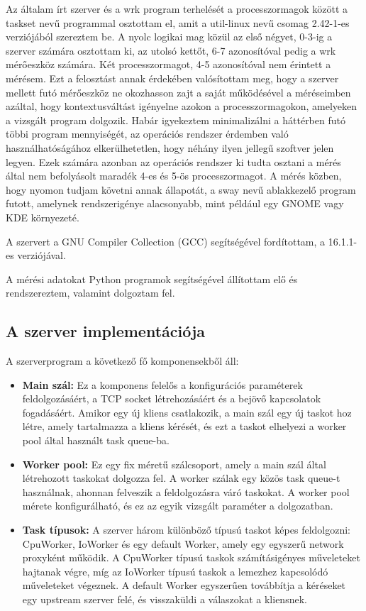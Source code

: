 \documentclass[11pt,a4paper]{article}
\begin{document}
Az általam írt szerver és a wrk program terhelését a processzormagok között a taskset nevű programmal osztottam el,
amit a util-linux nevű csomag 2.42-1-es verziójából szereztem be.
A nyolc logikai mag közül az első négyet, 0-3-ig a szerver számára osztottam ki, az utolsó kettőt, 6-7 azonosítóval
pedig a wrk mérőeszköz számára. Két processzormagot, 4-5 azonosítóval nem érintett a mérésem.
Ezt a felosztást annak érdekében valósítottam meg, hogy a szerver mellett futó mérőeszköz ne okozhasson zajt a saját
működésével a méréseimben azáltal, hogy kontextusváltást igényelne azokon a processzormagokon, amelyeken a vizsgált program
dolgozik. Habár igyekeztem minimalizálni a háttérben futó többi program mennyiségét, az operációs rendszer érdemben való
használhatóságához elkerülhetetlen, hogy néhány ilyen jellegű szoftver jelen legyen. Ezek számára azonban az operációs rendszer
ki tudta osztani a mérés által nem befolyásolt maradék 4-es és 5-ös processzormagot.
A mérés közben, hogy nyomon tudjam követni annak állapotát, a sway nevű ablakkezelő program futott, amelynek rendszerigénye alacsonyabb,
mint például egy GNOME vagy KDE környezeté.

A szervert a GNU Compiler Collection (GCC) segítségével fordítottam, a 16.1.1-es verziójával.

A mérési adatokat Python programok segítségével állítottam elő és rendszereztem, valamint dolgoztam fel.



\subsection{A szerver implementációja}
\label{ssec:implementacio}



A szerverprogram a következő fő komponensekből áll:
\begin{itemize}
    \item \textbf{Main szál:} Ez a komponens felelős a konfigurációs paraméterek feldolgozásáért, a TCP socket létrehozásáért és a bejövő kapcsolatok fogadásáért. Amikor egy új kliens csatlakozik, a main szál egy új taskot hoz létre, amely tartalmazza a kliens kérését, és ezt a taskot elhelyezi a worker pool által használt task queue-ba.
    \item \textbf{Worker pool:} Ez egy fix méretű szálcsoport, amely a main szál által létrehozott taskokat dolgozza fel. A worker szálak egy közös task queue-t használnak, ahonnan felveszik a feldolgozásra váró taskokat. A worker pool mérete konfigurálható, és ez az egyik vizsgált paraméter a dolgozatban.
    \item \textbf{Task típusok:} A szerver három különböző típusú taskot képes feldolgozni: CpuWorker, IoWorker és egy default Worker, amely egy egyszerű network proxyként működik. A CpuWorker típusú taskok számításigényes műveleteket hajtanak végre, míg az IoWorker típusú taskok a lemezhez kapcsolódó műveleteket végeznek. A default Worker egyszerűen továbbítja a kéréseket egy upstream szerver felé, és visszaküldi a válaszokat a kliensnek.
\end{itemize}
\end{document}
